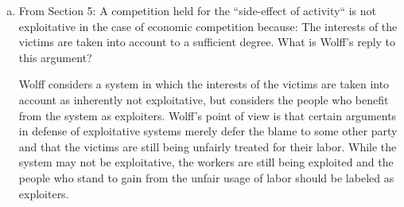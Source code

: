 \documentclass{article}
\begin{document}
\begin{enumerate}[a)]
  \item From Section 5: A competition held for the ``side-effect of activity`` is not exploitative in the case of economic competition because: The interests of the victims are taken into account to a sufficient degree. What is Wolff's reply to this argument?
  \par Wolff considers a system in which the interests of the victims are taken into account as inherently not exploitative, but considers the people who benefit from the system as exploiters. Wolff's point of view is that certain arguments in defense of exploitative systems merely defer the blame to some other party and that the victims are still being unfairly treated for their labor. While the system may not be exploitative, the workers are still being exploited and the people who stand to gain from the unfair usage of labor should be labeled as exploiters.
\end{enumerate}
\end{document}
